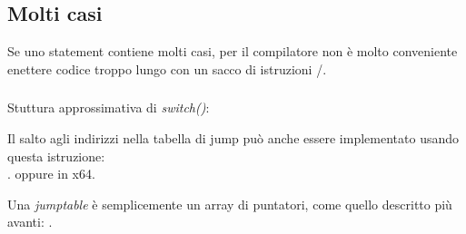 \subsection{Molti casi}

Se uno statement  contiene molti casi, per il compilatore non è molto conveniente enettere codice troppo lungo con un sacco di 
istruzioni \JE/\JNE.







\subsubsection{\Conclusion{}}

Stuttura approssimativa di \emph{switch()}:



Il salto agli indirizzi nella tabella di jump può anche essere implementato usando questa istruzione: \\
.
oppure  in x64.

Una \emph{jumptable} è semplicemente un array di puntatori, come quello descritto più avanti: .

